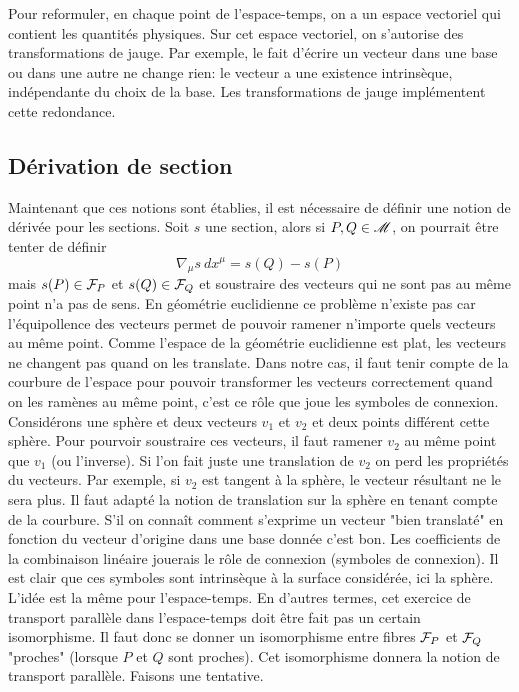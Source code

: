 \documentclass[a4paper,11pt]{report}
\begin{document}
                Pour reformuler, en chaque point de l'espace-temps, on a un espace vectoriel qui contient les quantités physiques. Sur cet espace vectoriel, on s'autorise des transformations de jauge. Par exemple, le fait d'écrire un vecteur dans une base ou dans une autre ne change rien: le vecteur a une existence intrinsèque, indépendante du choix de la base. Les transformations de jauge implémentent cette redondance.
            
            \subsection{Dérivation de section}
            
                Maintenant que ces notions sont établies, il est nécessaire de définir une notion de dérivée pour les sections. Soit $s$ une section, alors si $P,Q\in\mathscr{M}$, on pourrait être tenter de définir
                \begin{equation}
                    \nabla_\mu s~ dx^\mu = s(Q)-s(P)
                \end{equation}
                 mais $s(P)\in\mathcal{F}_P$ et $s(Q)\in\mathcal{F}_Q$ et soustraire des vecteurs qui ne sont pas au même point n'a pas de sens. En géométrie euclidienne ce problème n'existe pas car l'équipollence des vecteurs permet de pouvoir ramener n'importe quels vecteurs au même point. Comme l'espace de la géométrie euclidienne est plat, les vecteurs ne changent pas quand on les translate. Dans notre cas, il faut tenir compte de la courbure de l'espace pour pouvoir transformer les vecteurs correctement quand on les ramènes au même point, c'est ce rôle que joue les symboles de connexion. Considérons une sphère et deux vecteurs $v_1$ et $v_2$ et deux points différent cette sphère. Pour pourvoir soustraire ces vecteurs, il faut ramener $v_2$ au même point que $v_1$ (ou l'inverse). Si l'on fait juste une translation de $v_2$ on perd les propriétés du vecteurs. Par exemple, si $v_2$ est tangent à la sphère, le vecteur résultant ne le sera plus. Il faut adapté la notion de translation sur la sphère en tenant compte de la courbure. S'il on connaît comment s'exprime un vecteur "bien translaté" en fonction du vecteur d'origine dans une base donnée c'est bon. Les coefficients de la combinaison linéaire jouerais le rôle de connexion (symboles de connexion). Il est clair que ces symboles sont intrinsèque à la surface considérée, ici la sphère. L'idée est la même pour l'espace-temps. En d'autres termes, cet exercice de transport parallèle dans l'espace-temps doit être fait pas un certain isomorphisme. Il faut donc se donner un isomorphisme entre fibres $\mathcal{F}_P$ et $\mathcal{F}_Q$ "proches" (lorsque $P$ et $Q$ sont proches). Cet isomorphisme donnera la notion de transport parallèle. Faisons une tentative.
                 
\end{document}
